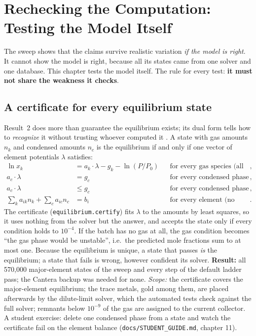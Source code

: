 \documentclass[11pt,a4paper]{article}
\begin{document}
\section{Rechecking the Computation: Testing the Model Itself}\label{ch:verification}
The sweep shows that the claims survive realistic variation \emph{if the model is right}. It cannot show the model is right, because all its states came from one solver and one database. This chapter tests the model itself. The rule for every test: \textbf{it must not share the weakness it checks}.

\subsection{A certificate for every equilibrium state}\label{sec:certificate}
Result~2 does more than guarantee the equilibrium exists; its dual form tells how to \emph{recognize} it without trusting whoever computed it \citep{boyd2004}. A state with gas amounts $n_k$ and condensed amounts $n_c$ is the equilibrium if and only if one vector of element potentials $\lambda$ satisfies:
\begin{align*}
\ln x_k &= a_k\cdot\lambda - g_k - \ln(P/P_0) && \text{for every gas species (all have the potential of their atoms)},\\
a_c\cdot\lambda &= g_c && \text{for every condensed phase present},\\
a_c\cdot\lambda &\le g_c && \text{for every condensed phase absent (nothing supersaturated)},\\
\textstyle\sum_k a_{ik}n_k + \sum_c a_{ic}n_c &= b_i && \text{for every element (no atom lost or made)}.
\end{align*}
The certificate (\texttt{equilibrium.certify}) fits $\lambda$ to the amounts by least squares, so it uses nothing from the solver but the answer, and accepts the state only if every condition holds to $10^{-4}$. If the batch has no gas at all, the gas condition becomes ``the gas phase would be unstable'', i.e.\ the predicted mole fractions sum to at most one. Because the equilibrium is unique, a state that passes \emph{is} the equilibrium; a state that fails is wrong, however confident its solver. \textbf{Result:} all 570,000 major-element states of the sweep and every step of the default ladder pass; the Cantera backup was needed for none. \emph{Scope:} the certificate covers the major-element equilibrium; the trace metals, gold among them, are placed afterwards by the dilute-limit solver, which the automated tests check against the full solver; remnants below $10^{-9}$ of the gas are assigned to the current collector. A student exercise: delete one condensed phase from a state and watch the certificate fail on the element balance (\texttt{docs/STUDENT\_GUIDE.md}, chapter 11).
\end{document}
